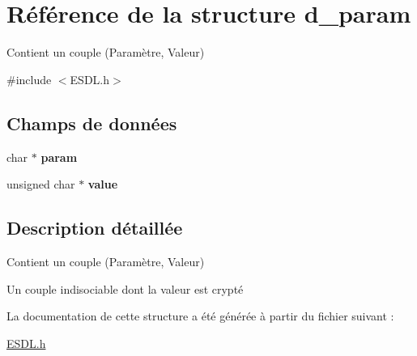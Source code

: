\hypertarget{structd__param}{\section{Référence de la structure d\+\_\+param}
\label{structd__param}
}


Contient un couple (Paramètre, Valeur)  




{\ttfamily \#include $<$E\+S\+D\+L.\+h$>$}

\subsection*{Champs de données}
\begin{DoxyCompactItemize}
\item 
\hypertarget{structd__param_a3f350a04cd0e5057bfb28d36b42733ab}{char $\ast$ {\bfseries param}}\label{structd__param_a3f350a04cd0e5057bfb28d36b42733ab}

\item 
\hypertarget{structd__param_a93087a3a56cc358ace4e5e2db91eb5ba}{unsigned char $\ast$ {\bfseries value}}\label{structd__param_a93087a3a56cc358ace4e5e2db91eb5ba}

\end{DoxyCompactItemize}


\subsection{Description détaillée}
Contient un couple (Paramètre, Valeur) 

Un couple indisociable dont la valeur est crypté 

La documentation de cette structure a été générée à partir du fichier suivant \+:\begin{DoxyCompactItemize}
\item 
\hyperlink{_e_s_d_l_8h}{E\+S\+D\+L.\+h}\end{DoxyCompactItemize}

